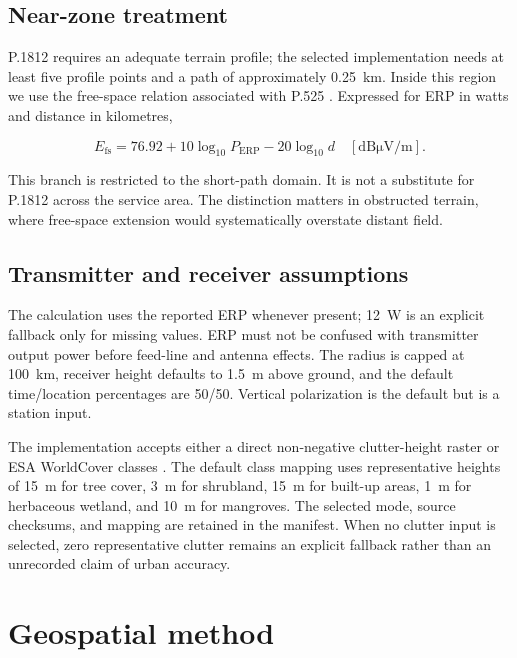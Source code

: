 \documentclass[10pt,a4paper,twocolumn]{article}
\begin{document}
\subsection{Near-zone treatment}

P.1812 requires an adequate terrain profile; the selected implementation needs
at least five profile points and a path of approximately \SI{0.25}{\kilo\meter}.
Inside this region we use the free-space relation associated with P.525
\cite{iturp525}. Expressed for ERP in watts and distance in kilometres,

\begin{equation}
E_{\mathrm{fs}} = 76.92 + 10\log_{10} P_{\mathrm{ERP}}
                 - 20\log_{10} d
\quad [\mathrm{dB\mu V/m}].
\label{eq:p525}
\end{equation}

This branch is restricted to the short-path domain. It is not a substitute for
P.1812 across the service area. The distinction matters in obstructed terrain,
where free-space extension would systematically overstate distant field.

\subsection{Transmitter and receiver assumptions}

The calculation uses the reported ERP whenever present; \SI{12}{\watt} is an
explicit fallback only for missing values. ERP must not be confused with
transmitter output power before feed-line and antenna effects. The radius is
capped at \SI{100}{\kilo\meter}, receiver height defaults to
\SI{1.5}{\meter} above ground, and the default time/location percentages are
50/50. Vertical polarization is the default but is a station input.

The implementation accepts either a direct non-negative clutter-height raster
or ESA WorldCover classes \cite{zanaga2022worldcover}. The default class mapping
uses representative heights of \SI{15}{\meter} for tree cover,
\SI{3}{\meter} for shrubland, \SI{15}{\meter} for built-up areas,
\SI{1}{\meter} for herbaceous wetland, and \SI{10}{\meter} for mangroves.
The selected mode, source checksums, and mapping are retained in the manifest.
When no clutter input is selected, zero representative clutter remains an
explicit fallback rather than an unrecorded claim of urban accuracy.

\section{Geospatial method}
\end{document}
